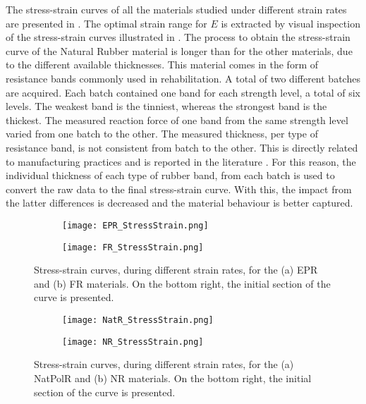 The stress-strain curves of all the materials studied under different strain rates are presented in . The optimal strain range for $E$ is extracted by visual inspection of the stress-strain curves illustrated in . The process to obtain the stress-strain curve of the Natural Rubber material is longer than for the other materials, due to the different available thicknesses. This material comes in the form of resistance bands commonly used in rehabilitation. A total of two different batches are acquired. Each batch contained one band for each strength level, a total of six levels. The weakest band is the tinniest, whereas the strongest band is the thickest. The measured reaction force of one band from the same strength level varied from one batch to the other. The measured thickness, per type of resistance band, is not consistent from batch to the other. This is directly related to manufacturing practices and is reported in the literature \cite{case2015soft}. For this reason, the individual thickness of each type of rubber band, from each batch is used to convert the raw data to the final stress-strain curve. With this, the impact from the latter differences is decreased and the material behaviour is better captured.
\newpage
\begin{figure}[H]
\vspace{-2em}
    \centering
        \begin{subfigure}[b]{0.93\textwidth}
        \centering
        \texttt{[image: EPR\_StressStrain.png]}
        \caption{}
        \label{sfig:EPRSS}
    \end{subfigure}
    \begin{subfigure}[b]{0.93\textwidth}
        \centering
        \texttt{[image: FR\_StressStrain.png]}
        \caption{}
        \label{sfig:FRSS}
    \end{subfigure}
    \caption{Stress-strain curves, during different strain rates, for the (a) EPR and (b) FR materials. On the bottom right, the initial section of the curve is presented.}
    \label{fig:EPR-FRSS}
\end{figure}
\newpage
\begin{figure}[H]
    \vspace{-2em}
    \centering
    \begin{subfigure}[b]{0.93\textwidth}
    \centering
    \texttt{[image: NatR\_StressStrain.png]}
    \caption{}
    \label{sfig:NatRSS}
    \end{subfigure}

    \begin{subfigure}[b]{0.93\textwidth}
    \centering
    \texttt{[image: NR\_StressStrain.png]}
    \caption{}
    \label{sfig:NRSS}
    \end{subfigure}
    \caption{Stress-strain curves, during different strain rates, for the (a) NatPolR and (b) NR materials. On the bottom right, the initial section of the curve is presented.}
    \label{fig:NatR-NRSS}
\end{figure}
